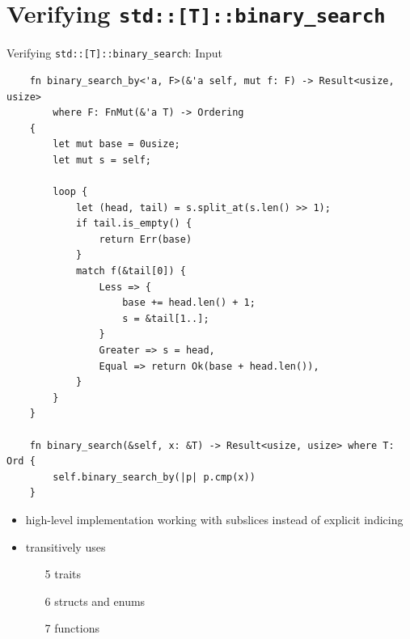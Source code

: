 \documentclass{beamer}
\begin{document}
\section{Verifying \texttt{std::[T]::binary\_search}}

\begin{frame}[fragile]{Verifying \texttt{std::[T]::binary\_search}: Input}
  \begin{verbatim}
    fn binary_search_by<'a, F>(&'a self, mut f: F) -> Result<usize, usize>
        where F: FnMut(&'a T) -> Ordering
    {
        let mut base = 0usize;
        let mut s = self;

        loop {
            let (head, tail) = s.split_at(s.len() >> 1);
            if tail.is_empty() {
                return Err(base)
            }
            match f(&tail[0]) {
                Less => {
                    base += head.len() + 1;
                    s = &tail[1..];
                }
                Greater => s = head,
                Equal => return Ok(base + head.len()),
            }
        }
    }

    fn binary_search(&self, x: &T) -> Result<usize, usize> where T: Ord {
        self.binary_search_by(|p| p.cmp(x))
    }
  \end{verbatim}

  \begin{itemize}
    \item high-level implementation working with subslices instead of explicit indicing
    \item transitively uses
      \begin{itemize}
        \item[5] traits
        \item[6] structs and enums
        \item[7] functions
      \end{itemize}
  \end{itemize}
\end{frame}
\end{document}
